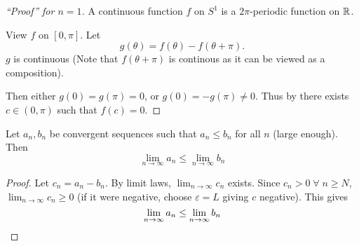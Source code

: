 \begin{proof}[``Proof'' for $n = 1$]
    A continuous function $f$ on $S^{1}$ is a $2\pi$-periodic function on $\mathbb{R}$.
    
    View $f$ on $[0, \pi]$. Let \[
        g(\theta) = f(\theta) - f(\theta + \pi).
    \] $g$ is continuous (Note that $f(\theta + \pi)$ is continous as it can be viewed as a composition).

    Then either $g(0) = g(\pi) = 0$, or $g(0) = -g(\pi) \neq 0$.
    Thus by  there exists $c \in (0, \pi)$ such that $f(c) = 0$.
\end{proof}

\begin{lem} \label{thm:sequence:comparison}
    Let $a_{n}, b_{n}$ be convergent sequences such that $a_{n} \leq b_{n}$ for all $n$ (large enough). Then \[
        \lim_{n \to \infty} a_{n} \leq \lim_{n \to \infty} b_{n}
    \]
\end{lem}
\begin{proof}
    Let $c_{n} = a_{n} - b_{n}$. By limit laws, $\lim_{n \to \infty} c_{n}$ exists. Since $c_{n} > 0 \;\forall\; n \geq N$, $\lim_{n \to \infty} c_{n} \geq 0$ (if it were negative, choose $\varepsilon = L$ giving $c$ negative). This gives \[
        \lim_{n \to \infty} a_{n} \leq \lim_{n \to \infty} b_{n} \qedhere
    \]
\end{proof}

